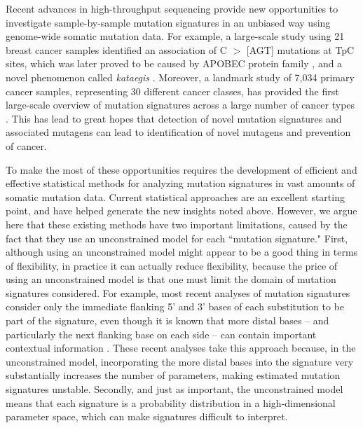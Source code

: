 \documentclass[10pt,letterpaper]{article}
\begin{document}
Recent advances in high-throughput sequencing provide
new opportunities to investigate sample-by-sample mutation signatures in an unbiased way
using genome-wide somatic mutation data. For example, a large-scale
study using 21 breast cancer samples identified an association of C $>$ [AGT] mutations at TpC sites, 
which was later proved to be caused by APOBEC protein family \cite{pmid23389445, pmid23852168, pmid23852170}, 
and a novel phenomenon called {\it kataegis} \cite{pmid22608084}. 
Moreover, a landmark study of 7,034 primary cancer samples, representing 30 different cancer classes, has provided the first large-scale overview of mutation signatures across a large number of cancer types \cite{pmid23945592}. This has lead to great hopes that detection of novel mutation signatures and associated mutagens can lead to identification of novel mutagens and prevention of cancer.

To make the most of these opportunities requires the development
of efficient and effective statistical methods for analyzing
mutation signatures in vast amounts of somatic mutation data.
Current statistical approaches \cite{pmid23318258,pmid23628380}
are an excellent starting point, 
and have helped generate the new insights noted above.
However, we argue here that these existing methods 
have two important limitations, caused by the fact that they
use an unconstrained model for each ``mutation signature."
First, although using an unconstrained model might appear to be a good thing in terms of flexibility, 
in practice it can actually reduce flexibility, because
the price of using an unconstrained model is that one must limit 
the domain of mutation signatures considered. 
For example, most recent analyses of mutation signatures
consider only the immediate flanking 5' and 3' bases of each substitution to be part of
the signature, even though it is known that more distal bases -- and particularly the
next flanking base on each side -- can contain important contextual information
\cite{pmid9683596}. These recent analyses take this approach because, in the unconstrained model,
incorporating the more distal bases into the signature very substantially increases the number of parameters, making estimated mutation signatures unstable.
Secondly, and just as important, the unconstrained model means
that each signature is a probability distribution in a high-dimensional
parameter space, which can make signatures difficult to interpret.
\end{document}
